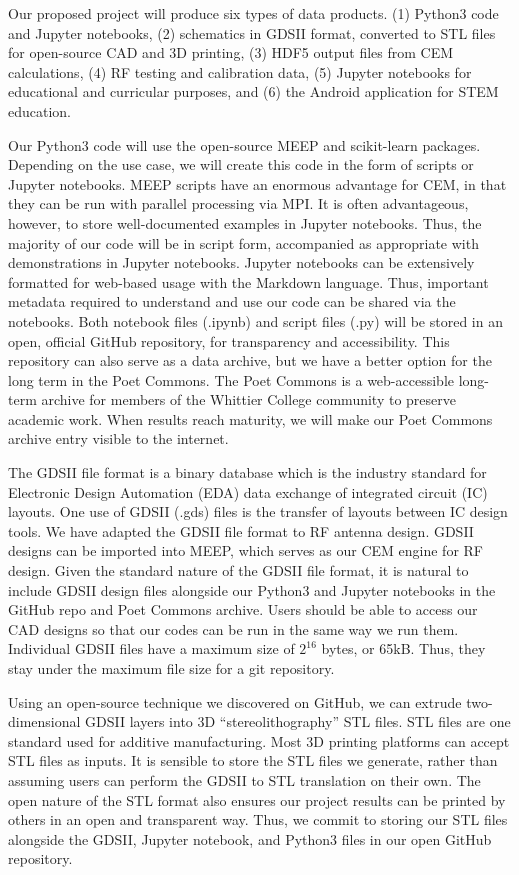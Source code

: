 \documentclass[11pt]{amsart}
\begin{document}
Our proposed project will produce six types of data products. (1) Python3 code and Jupyter notebooks, (2) schematics in GDSII format, converted to STL files for open-source CAD and 3D printing, (3) HDF5 output files from CEM calculations, (4) RF testing and calibration data, (5) Jupyter notebooks for educational and curricular purposes, and (6) the Android application for STEM education. 

Our Python3 code will use the open-source MEEP and scikit-learn packages.  Depending on the use case, we will create this code in the form of scripts or Jupyter notebooks.  MEEP scripts have an enormous advantage for CEM, in that they can be run with parallel processing via MPI.  It is often advantageous, however, to store well-documented examples in Jupyter notebooks.  Thus, the majority of our code will be in script form, accompanied as appropriate with demonstrations in Jupyter notebooks.  Jupyter notebooks can be extensively formatted for web-based usage with the Markdown language.  Thus, important metadata required to understand and use our code can be shared via the notebooks.  Both notebook files (.ipynb) and script files (.py) will be stored in an open, official GitHub repository, for transparency and accessibility.  This repository can also serve as a data archive, but we have a better option for the long term in the Poet Commons.  The Poet Commons is a web-accessible long-term archive for members of the Whittier College community to preserve academic work.  When results reach maturity, we will make our Poet Commons archive entry visible to the internet.  

The GDSII file format is a binary database which is the industry standard for Electronic Design Automation (EDA) data exchange of integrated circuit (IC) layouts.  One use of GDSII (.gds) files is the transfer of layouts between IC design tools.  We have adapted the GDSII file format to RF antenna design.  GDSII designs can be imported into MEEP, which serves as our CEM engine for RF design.  Given the standard nature of the GDSII file format, it is natural to include GDSII design files alongside our Python3 and Jupyter notebooks in the GitHub repo and Poet Commons archive.  Users should be able to access our CAD designs so that our codes can be run in the same way we run them.  Individual GDSII files have a maximum size of $2^{16}$ bytes, or 65kB.  Thus, they stay under the maximum file size for a git repository. 

Using an open-source technique we discovered on GitHub, we can extrude two-dimensional GDSII layers into 3D ``stereolithography'' STL files.  STL files are one standard used for additive manufacturing.  Most 3D printing platforms can accept STL files as inputs.  It is sensible to store the STL files we generate, rather than assuming users can perform the GDSII to STL translation on their own.  The open nature of the STL format also ensures our project results can be printed by others in an open and transparent way.  Thus, we commit to storing our STL files alongside the GDSII, Jupyter notebook, and Python3 files in our open GitHub repository. 
\end{document}
